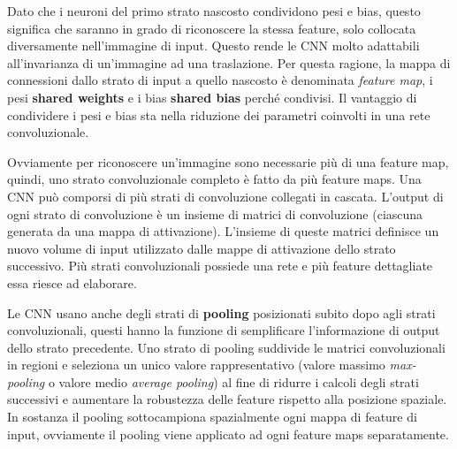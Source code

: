 \documentclass[twoside,twocolumn,10pt]{extarticle}
\theoremstyle{definition}
\begin{document}
Dato che i neuroni del primo strato nascosto condividono pesi e bias, questo significa che saranno in grado di riconoscere la stessa feature, solo collocata diversamente nell'immagine di input. Questo rende le CNN molto adattabili all'invarianza di un'immagine ad una traslazione. Per questa ragione, la mappa di connessioni dallo strato di input a quello nascosto è denominata \textit{feature map}, i pesi \textbf{shared weights} e i bias \textbf{shared bias} perché condivisi. Il vantaggio di condividere i pesi e bias sta nella riduzione dei parametri coinvolti in una rete convoluzionale.

Ovviamente per riconoscere un'immagine sono necessarie più di una feature map, quindi, uno strato convoluzionale completo è fatto da più feature maps.
Una CNN può comporsi di più strati di convoluzione collegati in cascata. L’output di ogni strato di convoluzione è un insieme di matrici di convoluzione (ciascuna generata da una mappa di attivazione). L’insieme di queste matrici definisce un nuovo volume di input utilizzato dalle mappe di attivazione dello strato successivo. Più strati convoluzionali possiede una rete e più feature dettagliate essa riesce ad elaborare.

Le CNN usano anche degli strati di \textbf{pooling} posizionati subito dopo agli strati convoluzionali, questi hanno la funzione di semplificare l'informazione di output dello strato precedente. Uno strato di pooling suddivide le matrici convoluzionali in regioni e seleziona un unico valore rappresentativo (valore massimo \textit{max-pooling} o valore medio \textit{average pooling}) al fine di ridurre i calcoli degli strati successivi e aumentare la robustezza delle feature rispetto alla posizione spaziale. In sostanza il pooling sottocampiona spazialmente ogni mappa di feature di input, ovviamente il pooling viene applicato ad ogni feature maps separatamente.
\end{document}
